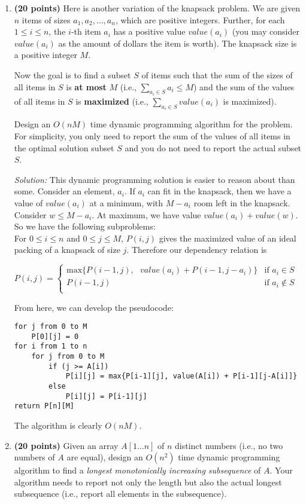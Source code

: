\documentclass[11pt]{article}
\begin{document}
\begin{enumerate}
\item
 {\bf (20 points)}
Here is another variation of the knapsack problem. We are given $n$ items of sizes
$a_1,a_2,\ldots,a_n$, which are positive integers. Further, for each $1\leq i\leq n$, the $i$-th item $a_i$ has a positive value $value(a_i)$ (you may consider $value(a_i)$ as the amount of dollars the item is worth). The knapsack size is a positive integer $M$.

Now the goal is to find a subset $S$ of items such that the
sum of the sizes of all items in $S$ is {\bf at most} $M$ (i.e., $\sum_{a_i\in S}a_i\leq M$) and the
sum of the values of all items in $S$ is {\bf maximized} (i.e., $\sum_{a_i\in S}value(a_i)$ is maximized).

Design an $O(nM)$ time dynamic programming algorithm for the problem. For simplicity, you only need to report the sum of
the values of all items in the optimal solution subset $S$ and you do not need to report the
actual subset $S$.

\textit{Solution:} This dynamic programming solution is easier to reason about than some. Consider an element, $a_i$. If $a_i$ can fit in the knapsack, then we have a value of $value(a_i)$ at a minimum, with $M - a_i$ room left in the knapsack. Consider $w \leq M - a_i$. At maximum, we have value $value(a_i) + value(w)$. So we have the following subproblems: \\
For $0 \leq i \leq n$ and $0 \leq j \leq M$, $P(i,j)$ gives the maximized value of an ideal packing of a knapsack of size $j$. Therefore our dependency relation is
\begin{flushleft}
$P(i, j) = 
\begin{cases} 
\mbox{max\{}P(i-1, j), \mbox{ } value(a_i)+P(i-1,j-a_i) \mbox{\}} & \mbox{if } a_i \in S \\ 
P(i-1, j) & \mbox{if } a_i \notin S \\
\end{cases}$
\end{flushleft}
From here, we can develop the pseudocode:
\begin{verbatim}
for j from 0 to M
    P[0][j] = 0
for i from 1 to n
    for j from 0 to M
        if (j >= A[i])
            P[i][j] = max{P[i-1][j], value(A[i]) + P[i-1][j-A[i]]}
        else
            P[i][j] = P[i-1][j]
return P[n][M]
\end{verbatim}
The algorithm is clearly $O(nM)$.

\item
{ \bf (20 points)}
Given an array $A[1\ldots n]$ of $n$ distinct numbers (i.e., no two
numbers of $A$ are equal), design an
$O(n^2)$ time dynamic programming algorithm to find a {\em longest
monotonically increasing subsequence} of $A$. Your algorithm needs to
report not only the length but also the actual longest subsequence (i.e., report all elements in the subsequence).


\end{enumerate}
\end{document}
